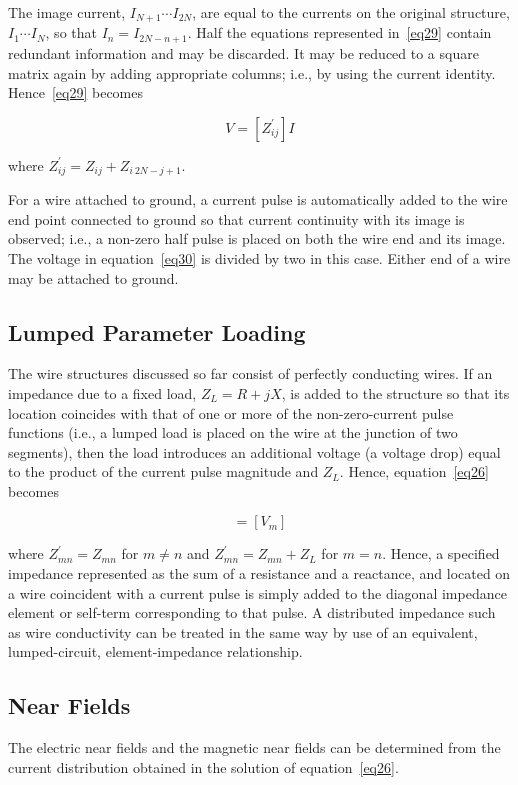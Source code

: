 \documentclass[12pt]{article}
\begin{document}
The image current, $I_{N+1}\cdots I_{2N}$, are equal to the currents on
the original structure, $I_1\cdots I_N$, so that $I_n = I_{2N-n+1}$. Half
the equations represented in~\eqref{eq29} contain redundant information
and may be discarded. It may be reduced to a square matrix again by
adding appropriate columns; i.e., by using the current identity.
Hence~\eqref{eq29} becomes

\begin{equation}
V=[Z^\prime_{ij}]I
\label{eq30}
\end{equation}

\noindent where $Z^\prime_{ij} = Z_{ij} + Z_{i\ 2N-j+1}$.

For a wire attached to ground, a current pulse is automatically added to
the wire end point connected to ground so that current continuity with
its image is observed; i.e., a non-zero half pulse is placed on both the
wire end and its image. The voltage in equation~\eqref{eq30} is divided
by two in this case. Either end of a wire may be attached to ground.

\subsection{Lumped Parameter Loading}
The wire structures discussed so far consist of perfectly conducting
wires. If an impedance due to a fixed load, $Z_L = R + jX$, is added to
the structure so that its location coincides with that of one or more of
the non-zero-current pulse functions (i.e., a lumped load is placed on
the wire at the junction of two segments), then the load introduces an
additional voltage (a voltage drop) equal to the product of the current
pulse magnitude and $Z_L$. Hence, equation~\eqref{eq26} becomes

\begin{equation}
[Z^\prime_{mn}][I_n]=[V_m]
\label{eq31}
\end{equation}

where $Z^\prime_{mn}=Z_{mn}$ for $m\ne n$ and $Z^\prime_{mn}=Z_{mn}+Z_L$
for $m=n$. Hence, a specified impedance represented as the sum of a
resistance and a reactance, and located on a wire coincident with a
current pulse is simply added to the diagonal impedance element or
self-term corresponding to that pulse. A distributed impedance such as
wire conductivity can be treated in the same way by use of an
equivalent, lumped-circuit, element-impedance relationship.

\subsection{Near Fields}
The electric near fields and the magnetic near fields can be determined
from the current distribution obtained in the solution of
equation~\eqref{eq26}.
\end{document}
